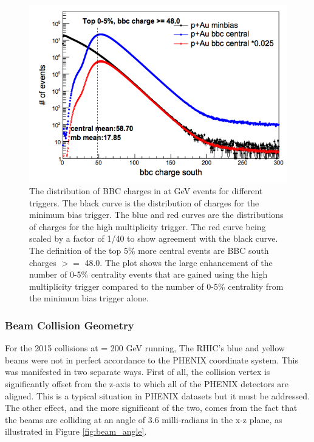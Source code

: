 
\begin{figure}[h!]
\begin{center}
\includegraphics[scale=0.55]{figs/pAu_centrality_trigger.png}
\end{center}
\caption{The distribution of BBC charges in \pau at  GeV events for different triggers. The black curve is the distribution of charges for the minimum bias trigger. The blue and red curves are the distributions of charges for the high multiplicity trigger. The red curve being scaled by a factor of 1/40 to show agreement with the black curve. The definition of the top 5\% more central events are BBC south charges $>=$ 48.0. The plot shows the large enhancement of the number of 0-5\% centrality events that are gained using the high multiplicity trigger compared to the number of 0-5\% centrality from the minimum bias trigger alone.}\label{fig:pau_centrality_trig}

\end{figure}

\subsubsection{Beam Collision Geometry}
\label{sec:ch2_beam_col_geo}
For the 2015 \pau collisions at \sqsn = 200 GeV running, The RHIC's blue and yellow beams were not in perfect accordance to the PHENIX coordinate system. This was manifested in two separate ways. First of all, the collision vertex is significantly offset from the z-axis to which all of the PHENIX detectors are aligned. This is a typical situation in PHENIX datasets but it must be addressed. The other effect, and the more significant of the two, comes from the fact that the beams are colliding at an angle of 3.6 milli-radians in the x-z plane, as illustrated in Figure \ref{fig:beam_angle}. 

